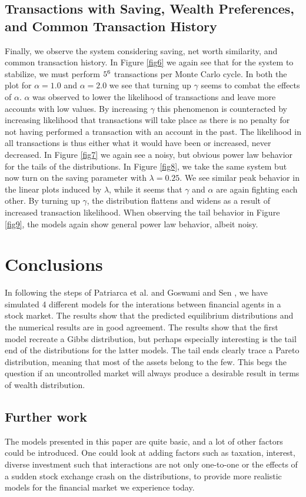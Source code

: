 \documentclass{emulateapj}
\begin{document}
\subsection{Transactions with Saving, Wealth Preferences, and Common Transaction History}
Finally, we observe the system considering saving, net worth similarity, and common transaction history. In Figure \ref{fig6} we again see that for the system to stabilize, we must perform $5\time10^6$ transactions per Monte Carlo cycle. In both the plot for $\alpha = 1.0$ and $\alpha = 2.0$ we see that turning up $\gamma$ seems to combat the effects of $\alpha$. $\alpha$ was observed to lower the likelihood of transactions and leave more accounts with low values. By increasing $\gamma$ this phenomenon is counteracted by increasing likelihood that transactions will take place as there is no penalty for not having performed a transaction with an account in the past. The likelihood in all transactions is thus either what it would have been or increased, never decreased. In Figure \ref{fig7} we again see a noisy, but obvious power law behavior for the tails of the distributions. In Figure \ref{fig8}, we take the same system but now turn on the saving parameter with $\lambda = 0.25$. We see similar peak behavior in the linear plots induced by $\lambda$, while it seems that $\gamma$ and $\alpha$ are again fighting each other. By turning up $\gamma$, the distribution flattens and widens as a result of increased transaction likelihood. When observing the tail behavior in Figure \ref{fig9}, the models again show general power law behavior, albeit noisy.

\section{Conclusions}
\label{sec:conclusions}
In following the steps of Patriarca et al. \cite{paper1} and Goswami and Sen \cite{paper2}, we have simulated 4 different models for the interations between financial agents in a stock market. The results show that the predicted equilibrium distributions and the numerical results are in good agreement. The results show that the first model recreate a Gibbs distribution, but perhaps especially interesting is the tail end of the distributions for the latter models. The tail ends clearly trace a Pareto distribution, meaning that most of the assets belong to the few. This begs the question if an uncontrolled market will always produce a desirable result in terms of wealth distribution.

\subsection{Further work}
The models presented in this paper are quite basic, and a lot of other factors could be introduced. One could look at adding factors such as taxation, interest, diverse investment such that interactions are not only one-to-one or the effects of a sudden stock exchange crash on the distributions, to provide more realistic models for the financial market we experience today.
\end{document}
